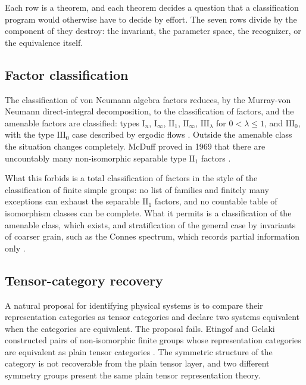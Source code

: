 \documentclass[11pt,letterpaper]{article}
\theoremstyle{definition}
\theoremstyle{remark}
\begin{document}
Each row is a theorem, and each theorem decides a question that a classification program would otherwise have to decide by effort. The seven rows divide by the component of  they destroy: the invariant, the parameter space, the recognizer, or the equivalence itself.

\subsection{Factor classification}

The classification of von Neumann algebra factors reduces, by the Murray-von Neumann direct-integral decomposition, to the classification of factors, and the amenable factors are classified: types $\mathrm{I}_n$, $\mathrm{I}_\infty$, $\mathrm{II}_1$, $\mathrm{II}_\infty$, $\mathrm{III}_\lambda$ for $0 < \lambda \leq 1$, and $\mathrm{III}_0$, with the type $\mathrm{III}_0$ case described by ergodic flows \cite{connes1976,vnwiki}. Outside the amenable class the situation changes completely. McDuff proved in 1969 that there are uncountably many non-isomorphic separable type $\mathrm{II}_1$ factors \cite{mcduff1969}.

What this forbids is a total classification of factors in the style of the classification of finite simple groups: no list of families and finitely many exceptions can exhaust the separable $\mathrm{II}_1$ factors, and no countable table of isomorphism classes can be complete. What it permits is a classification of the amenable class, which exists, and stratification of the general case by invariants of coarser grain, such as the Connes spectrum, which records partial information only \cite{vnwiki}.

\subsection{Tensor-category recovery}
\label{sec:tensor-recovery}

A natural proposal for identifying physical systems is to compare their representation categories as tensor categories and declare two systems equivalent when the categories are equivalent. The proposal fails. Etingof and Gelaki constructed pairs of non-isomorphic finite groups whose representation categories are equivalent as plain tensor categories \cite{eg2000}. The symmetric structure of the category is not recoverable from the plain tensor layer, and two different symmetry groups present the same plain tensor representation theory.
\end{document}
